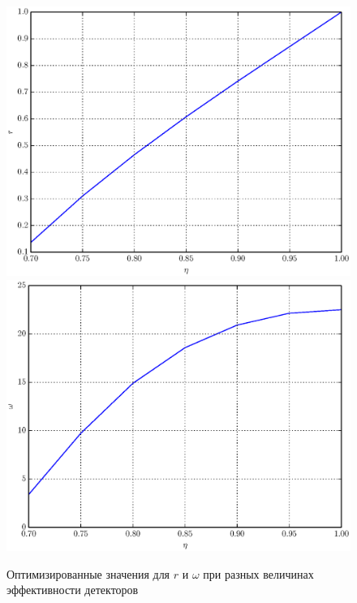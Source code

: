 \documentclass[%
master,         %
subf,           %
href,           %
,times         %
]{disser}
\numberwithin{equation}{section}
\numberwithin{figure}{section}
\begin{document}
\begin{figure}[h]
\includegraphics[scale=0.7]{r.eps}
\includegraphics[scale=0.7]{omega.eps}
\caption{Оптимизированные значения для $r$ и $\omega$ при разных величинах эффективности детекторов}
\label{fig:psi_opt}
\end{figure}
\end{document}
